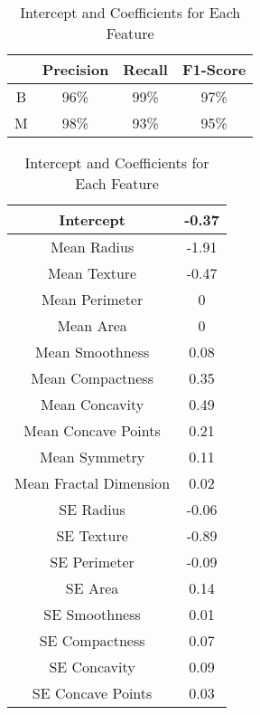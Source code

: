 \documentclass[conference]{IEEEtran}
\begin{document}
\begin{table}[]
        \centering
        \caption{Classification Report for Testing Data}
        \begin{tabular}{|c|c|c|c|}
             \hline
             & Precision & Recall & F1-Score\\
             \hline
             B & 96\% & 99\% & 97\%\\
             \hline
             M & 98\% & 93\% & 95\%\\
             \hline
        \end{tabular}

       \caption{Intercept and Coefficients for Each Feature}
        \begin{tabular}{|c|c|}
	     \hline
             Intercept & -0.37\\
             \hline
             Mean Radius & -1.91\\
             \hline
             Mean Texture & -0.47\\
             \hline
             Mean Perimeter & 0\\
             \hline
             Mean Area & 0\\
             \hline
             Mean Smoothness & 0.08\\
             \hline
             Mean Compactness & 0.35\\
             \hline
             Mean Concavity & 0.49\\
             \hline
             Mean Concave Points & 0.21\\
             \hline
             Mean Symmetry & 0.11\\
             \hline
             Mean Fractal Dimension & 0.02\\
             \hline
             SE Radius & -0.06\\
             \hline
             SE Texture & -0.89\\
             \hline
             SE Perimeter & -0.09\\
             \hline
             SE Area & 0.14\\
             \hline
             SE Smoothness & 0.01\\
             \hline
             SE Compactness & 0.07\\
             \hline
             SE Concavity & 0.09\\
             \hline
             SE Concave Points & 0.03\\
             \hline

\end{tabular}
\end{table}
\end{document}
